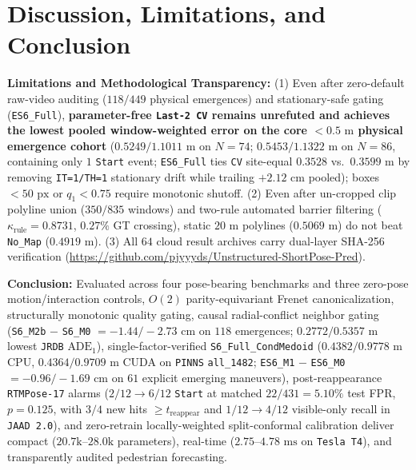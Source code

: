 \documentclass[journal]{IEEEtran}
\begin{document}
\section{Discussion, Limitations, and Conclusion}
\textbf{Limitations and Methodological Transparency:} (1) Even after zero-default raw-video auditing ($118/449$ physical emergences) and stationary-safe gating (\texttt{ES6\_Full}), \textbf{parameter-free \texttt{Last-2 CV} remains unrefuted and achieves the lowest pooled window-weighted error on the core $<0.5\text{ m}$ physical emergence cohort} ($0.5249 / 1.1011\text{ m}$ on $N=74$; $0.5453 / 1.1322\text{ m}$ on $N=86$, containing only $1$ \texttt{Start} event; \texttt{ES6\_Full} ties \texttt{CV} site-equal $0.3528$ vs.\ $0.3599\text{ m}$ by removing \texttt{IT=1/TH=1} stationary drift while trailing $+2.12\text{ cm}$ pooled); boxes $<50\text{ px}$ or $q_1 < 0.75$ require monotonic shutoff. (2) Even after un-cropped clip polyline union ($350/835$ windows) and two-rule automated barrier filtering ($\kappa_{\text{rule}} = 0.8731$, $0.27\%$ GT crossing), static $20\text{ m}$ polylines ($0.5069\text{ m}$) do not beat \texttt{No\_Map} ($0.4919\text{ m}$). (3) All $64$ cloud result archives carry dual-layer SHA-256 verification (\url{https://github.com/pjyyyds/Unstructured-ShortPose-Pred}).

\textbf{Conclusion:} Evaluated across four pose-bearing benchmarks and three zero-pose motion/interaction controls, $O(2)$ parity-equivariant Frenet canonicalization, structurally monotonic quality gating, causal radial-conflict neighbor gating (\texttt{S6\_M2b} $-$ \texttt{S6\_M0} $= -1.44 / -2.73\text{ cm}$ on $118$ emergences; $0.2772 / 0.5357\text{ m}$ lowest \texttt{JRDB} $\text{ADE}_1$), single-factor-verified \texttt{S6\_Full\_CondMedoid} ($0.4382 / 0.9778\text{ m}$ CPU, $0.4364 / 0.9709\text{ m}$ CUDA on \texttt{PINNS} \texttt{all\_1482}; \texttt{ES6\_M1} $-$ \texttt{ES6\_M0} $= -0.96 / -1.69\text{ cm}$ on $61$ explicit emerging maneuvers), post-reappearance \texttt{RTMPose-17} alarms ($2/12 \to 6/12$ \texttt{Start} at matched $22/431 = 5.10\%$ test FPR, $p=0.125$, with $3/4$ new hits $\ge t_{\text{reappear}}$ and $1/12 \to 4/12$ visible-only recall in \texttt{JAAD 2.0}), and zero-retrain locally-weighted split-conformal calibration deliver compact ($20.7\text{k}\text{--}28.0\text{k}$ parameters), real-time ($2.75\text{--}4.78\text{ ms}$ on \texttt{Tesla T4}), and transparently audited pedestrian forecasting.



\end{document}
